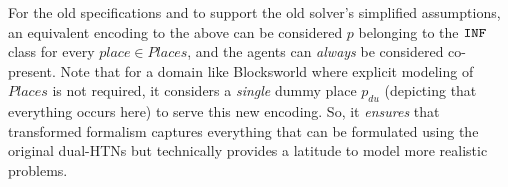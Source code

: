 \documentclass[letterpaper]{article} %
\newtheorem{lemma}[theorem]{Lemma}
\begin{document}
For the old specifications and to support the old solver's simplified assumptions, an equivalent encoding to the above can be considered $p$ belonging to the $\texttt{INF}$ class for every $place \in \mathit{Places}$, and the agents can \textit{always} be considered co-present.  
Note that for a domain like Blocksworld where explicit modeling of $\mathit{Places}$ is not required, it considers a \textit{single} dummy place $p_{du}$ (depicting that everything occurs here) to serve this new encoding. So, it \textit{ensures} that transformed formalism captures everything that can be formulated using the original dual-HTNs but technically provides a latitude to model more realistic problems. 







\end{document}
